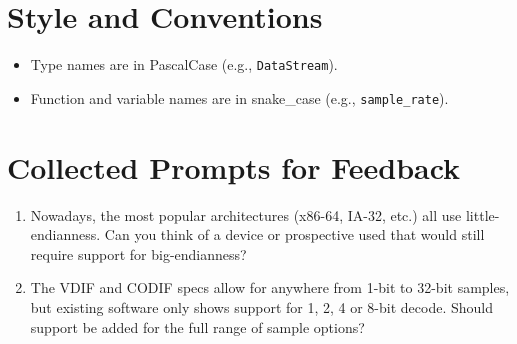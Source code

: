 \documentclass[11pt]{article}
\begin{document}
\section{Style and Conventions}

\begin{itemize}
	\item Type names are in PascalCase (e.g., \lstinline{DataStream}).
	\item Function and variable names are in snake\_case (e.g., \lstinline{sample_rate}).
\end{itemize}

\section{Collected Prompts for Feedback}

\begin{enumerate}
	\item Nowadays, the most popular architectures (x86-64, IA-32, etc.) all use little-endianness. Can you think of a device or prospective used that would still require support for big-endianness?
	\item The VDIF and CODIF specs allow for anywhere from 1-bit to 32-bit samples, but existing software only shows support for 1, 2, 4 or 8-bit decode. Should support be added for the full range of sample options?
\end{enumerate}

	
\end{document}
